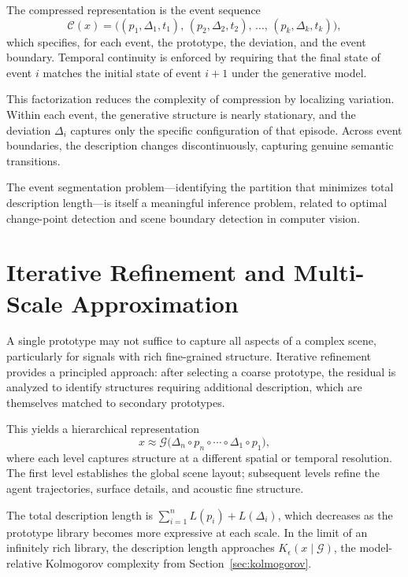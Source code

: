 \documentclass[12pt,a4paper]{article}
\theoremstyle{definition}
\theoremstyle{remark}
\begin{document}
The compressed representation is the event sequence
\[
\mathcal{C}(x) = \big((p_1, \Delta_1, t_1), \, (p_2, \Delta_2, t_2), \, \dots, \, (p_k, \Delta_k, t_k)\big),
\]
which specifies, for each event, the prototype, the deviation, and the event boundary. Temporal continuity is enforced by requiring that the final state of event $i$ matches the initial state of event $i+1$ under the generative model.

This factorization reduces the complexity of compression by localizing variation. Within each event, the generative structure is nearly stationary, and the deviation $\Delta_i$ captures only the specific configuration of that episode. Across event boundaries, the description changes discontinuously, capturing genuine semantic transitions.

The event segmentation problem---identifying the partition that minimizes total description length---is itself a meaningful inference problem, related to optimal change-point detection and scene boundary detection in computer vision.

\section{Iterative Refinement and Multi-Scale Approximation}
\label{sec:multiscale}

A single prototype may not suffice to capture all aspects of a complex scene, particularly for signals with rich fine-grained structure. Iterative refinement provides a principled approach: after selecting a coarse prototype, the residual is analyzed to identify structures requiring additional description, which are themselves matched to secondary prototypes.

This yields a hierarchical representation
\[
x \approx \mathcal{G}\big(\Delta_n \circ p_n \circ \cdots \circ \Delta_1 \circ p_1\big),
\]
where each level captures structure at a different spatial or temporal resolution. The first level establishes the global scene layout; subsequent levels refine the agent trajectories, surface details, and acoustic fine structure.

The total description length is $\sum_{i=1}^n L(p_i) + L(\Delta_i)$, which decreases as the prototype library becomes more expressive at each scale. In the limit of an infinitely rich library, the description length approaches $K_\epsilon(x \mid \mathcal{G})$, the model-relative Kolmogorov complexity from Section~\ref{sec:kolmogorov}.
\end{document}
